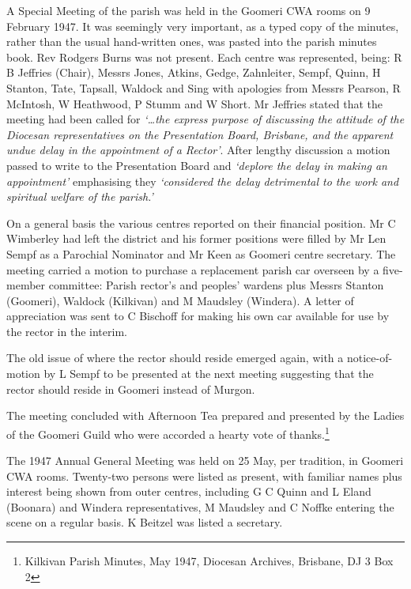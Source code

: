 A Special Meeting of the parish was held in the Goomeri CWA rooms on 9 February 1947. It was seemingly very important, as a typed copy of the minutes, rather than the usual hand-written ones, was pasted into the parish minutes book. Rev Rodgers Burns was not present. Each centre was represented, being: R B Jeffries (Chair), Messrs Jones, Atkins, Gedge, Zahnleiter, Sempf, Quinn, H Stanton, Tate, Tapsall, Waldock and Sing with apologies from Messrs Pearson, R McIntosh, W Heathwood, P Stumm and W Short. Mr Jeffries stated that the meeting had been called for \emph{`\ldots the express purpose of discussing the attitude of the Diocesan representatives on the Presentation Board, Brisbane, and the apparent undue delay in the appointment of a Rector'}. After lengthy discussion a motion passed to write to the Presentation Board and \emph{`deplore the delay in making an appointment'} emphasising they \emph{`considered the delay detrimental to the work and spiritual welfare of the parish.'}



On a general basis the various centres reported on their financial position. Mr C Wimberley had left the district and his former positions were filled by Mr Len Sempf as a Parochial Nominator and Mr Keen as Goomeri centre secretary. The meeting carried a motion to purchase a replacement parish car overseen by a five-member committee: Parish rector's and peoples' wardens plus Messrs Stanton (Goomeri), Waldock (Kilkivan) and M Maudsley (Windera). A letter of appreciation was sent to C Bischoff for making his own car available for use by the rector in the interim.



The old issue of where the rector should reside emerged again, with a notice-of-motion by L Sempf to be presented at the next meeting suggesting that the rector should reside in Goomeri instead of Murgon.



The meeting concluded with Afternoon Tea prepared and presented by the Ladies of the Goomeri Guild who were accorded a hearty vote of thanks.\footnote{Kilkivan Parish Minutes, May 1947, Diocesan Archives, Brisbane, DJ 3 Box 2}


The 1947 Annual General Meeting was held on 25 May, per tradition, in Goomeri CWA rooms. Twenty-two persons were listed as present, with familiar names plus interest being shown from outer centres, including G C Quinn and L Eland (Boonara) and Windera representatives, M Maudsley and C Noffke entering the scene on a regular basis. K Beitzel was listed a secretary.



